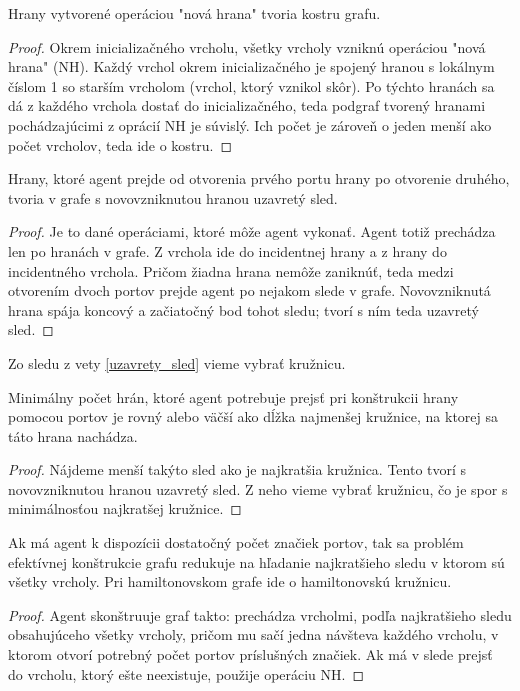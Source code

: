 \begin{lem}
Hrany vytvorené operáciou "nová hrana" tvoria kostru grafu.
\end{lem}
\begin{proof}
Okrem inicializačného vrcholu, všetky vrcholy vzniknú operáciou "nová hrana"
(NH). Každý vrchol okrem inicializačného je spojený hranou s lokálnym číslom
1 so starším vrcholom (vrchol, ktorý vznikol skôr). Po týchto hranách sa dá
z každého vrchola dostať do inicializačného, teda podgraf tvorený hranami
pochádzajúcimi z oprácií NH je súvislý. Ich počet je zároveň o jeden menší ako počet
vrcholov, teda ide o kostru.
\end{proof}
\begin{lem}
\label{uzavrety_sled}
Hrany, ktoré agent prejde od otvorenia prvého portu hrany po otvorenie druhého,
tvoria v grafe s novovzniknutou hranou uzavretý sled.
\end{lem}
\begin{proof}
Je to dané operáciami, ktoré môže agent vykonať. Agent totiž prechádza len
po hranách v grafe. Z vrchola ide do incidentnej hrany a z hrany do
incidentného vrchola. Pričom žiadna hrana nemôže zaniknúť, teda medzi otvorením
dvoch portov prejde agent po nejakom slede v grafe. Novovzniknutá hrana
spája koncový a začiatočný bod tohot sledu; tvorí s ním teda uzavretý sled.
\end{proof}
\begin{pozn}
Zo sledu z vety \ref{uzavrety_sled} vieme vybrať kružnicu.
\end{pozn}
\begin{lem}
\label{minimum}
Minimálny počet hrán, ktoré agent potrebuje prejsť pri konštrukcii hrany pomocou
portov je rovný alebo väčší ako dĺžka najmenšej kružnice, na ktorej sa táto
hrana nachádza.
\end{lem}
\begin{proof}
Nájdeme menší takýto sled ako je najkratšia kružnica. Tento tvorí s
novovzniknutou hranou uzavretý sled. Z neho vieme vybrať
kružnicu, čo je spor s minimálnosťou najkratšej kružnice.
\end{proof}
\begin{lem}
Ak má agent k dispozícii dostatočný počet značiek portov, 
tak sa problém efektívnej konštrukcie grafu
redukuje na hľadanie najkratšieho sledu v ktorom sú všetky vrcholy. Pri
hamiltonovskom grafe ide o hamiltonovskú kružnicu.
\end{lem}
\begin{proof}
Agent skonštruuje graf takto: prechádza vrcholmi, podľa najkratšieho sledu
obsahujúceho všetky vrcholy, pričom mu sačí jedna návšteva každého vrcholu,
 v ktorom
otvorí potrebný počet portov príslušných značiek. Ak má v slede prejsť do
vrcholu, ktorý ešte neexistuje, použije operáciu NH.
\end{proof}
